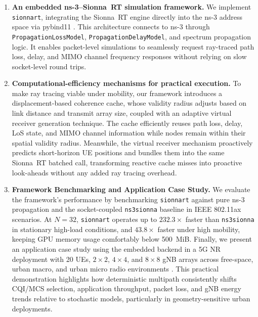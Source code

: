 \begin{enumerate}
    \item \textbf{An embedded ns-3--Sionna~RT simulation framework.} We implement \texttt{sionnart}, integrating the Sionna~RT engine directly into the ns-3 address space via pybind11 \cite{sionna,sionnart,pybind11}. This architecture connects to ns-3 through \texttt{PropagationLossModel}, \texttt{PropagationDelayModel}, and spectrum propagation logic. It enables packet-level simulations to seamlessly request ray-traced path loss, delay, and MIMO channel frequency responses without relying on slow socket-level round trips.

    \item \textbf{Computational-efficiency mechanisms for practical execution.} To make ray tracing viable under mobility, our framework introduces a displacement-based coherence cache, whose validity radius adjusts based on link distance and transmit array size, coupled with an adaptive virtual receiver generation technique. The cache efficiently reuses path loss, delay, LoS state, and MIMO channel information while nodes remain within their spatial validity radius. Meanwhile, the virtual receiver mechanism proactively predicts short-horizon UE positions and bundles them into the same Sionna~RT batched call, transforming reactive cache misses into proactive look-aheads without any added ray tracing overhead.

    \item \textbf{Framework Benchmarking and Application Case Study.} We evaluate the framework's performance by benchmarking \texttt{sionnart} against pure ns-3 propagation and the socket-coupled \texttt{ns3sionna} baseline in IEEE 802.11ax scenarios. At $N=32$, \texttt{sionnart} operates up to $232.3\times$ faster than \texttt{ns3sionna} in stationary high-load conditions, and $43.8\times$ faster under high mobility, keeping GPU memory usage comfortably below 500~MiB. Finally, we present an application case study using the embedded backend in a 5G NR deployment with 20 UEs, $2\times2$, $4\times4$, and $8\times8$ gNB arrays across free-space, urban macro, and urban micro radio environments \cite{5glena,tr38901,bojovic_mimo}. This practical demonstration highlights how deterministic multipath consistently shifts CQI/MCS selection, application throughput, packet loss, and gNB energy trends relative to stochastic models, particularly in geometry-sensitive urban deployments.
\end{enumerate}

